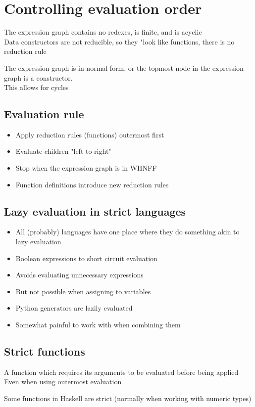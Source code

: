 \documentclass{article}[18pt]
\begin{document}
\section{Controlling evaluation order}
\begin{defin}
The expression graph contains no redexes, is finite, and is acyclic\\
Data constructors are not reducible, so they "look like functions, there is no reduction rule
\end{defin}
\begin{defin}
The expression graph is in normal form, or the topmost node in the expression graph is a constructor.\\
This allows for cycles
\end{defin}
\subsection{Evaluation rule}
\begin{itemize}
	\item Apply reduction rules (functions) outermost first
	\item Evaluate children "left to right"
	\item Stop when the expression graph is in WHNFF
	\item Function definitions introduce new reduction rules
\end{itemize}
\subsection{Lazy evaluation in strict languages}
\begin{itemize}
	\item All (probably) languages have one place where they do something akin to lazy evaluation
	\item Boolean expressions to short circuit evaluation
	\item Avoids evaluating unnecessary expressions
	\item But not possible when assigning to variables
	\item Python generators are lazily evaluated
	\item Somewhat painful to work with when combining them
\end{itemize}
\subsection{Strict functions}
\begin{defin}
A function which requires its arguments to be evaluated before being applied\\
Even when using outermost evaluation
\end{defin}
Some functions in Haskell are strict (normally when working with numeric types)
\end{document}
